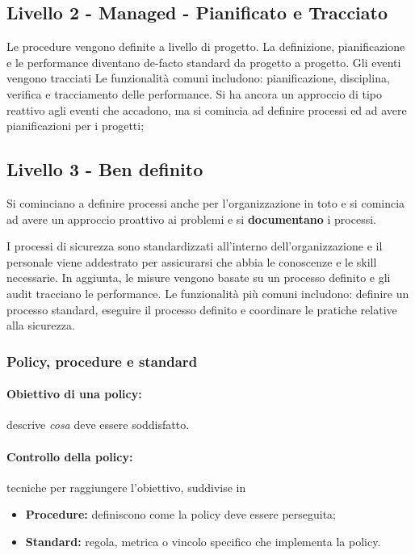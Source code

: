 \subsection{Livello 2 - Managed - Pianificato e Tracciato}

Le procedure vengono definite a livello di progetto. La definizione,
pianificazione e le performance diventano de-facto standard da progetto a
progetto. Gli eventi vengono tracciati Le funzionalità comuni includono:
pianificazione, disciplina, verifica e tracciamento delle performance.
Si ha ancora un approccio di tipo reattivo agli
eventi che accadono, ma si comincia ad definire processi ed ad avere
pianificazioni per i progetti;


\subsection{Livello 3 - Ben definito}


Si cominciano a definire processi anche per
l'organizzazione in toto e si comincia ad avere un approccio 
proattivo ai  problemi e si \textbf{documentano} i processi.

I processi di sicurezza sono standardizzati all'interno dell'organizzazione e
il personale viene addestrato per assicurarsi che abbia le conoscenze e le
skill necessarie. In aggiunta, le misure vengono basate su un processo
definito e gli audit tracciano le performance. Le funzionalità più comuni
includono: definire un processo standard, eseguire il processo definito e
coordinare le pratiche relative alla sicurezza.

\subsubsection{Policy, procedure e standard}

\paragraph*{Obiettivo di una policy:} descrive \textit{cosa} deve essere
soddisfatto.

\paragraph*{Controllo della policy:} tecniche per raggiungere l'obiettivo,
suddivise in
\begin{itemize}
  \item \textbf{Procedure:} definiscono come la policy deve essere perseguita;
  \item \textbf{Standard:} regola, metrica o vincolo specifico che implementa
  la policy.
\end{itemize}

